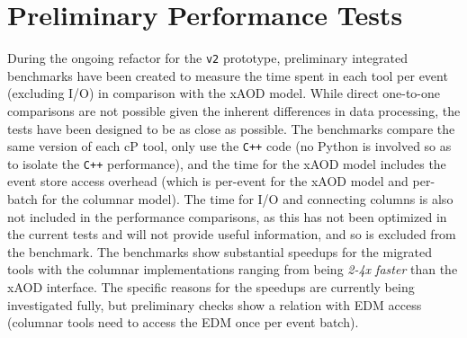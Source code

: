 \section{Preliminary Performance Tests}\label{sec:performance}

During the ongoing refactor for the \texttt{v2} prototype, preliminary integrated benchmarks have been created to measure the time spent in each tool per event (excluding I/O) in comparison with the xAOD model.
While direct one-to-one comparisons are not possible given the inherent differences in data processing, the tests have been designed to be as close as possible.
The benchmarks compare the same version of each cP tool, only use the \texttt{C++} code (no Python is involved so as to isolate the \texttt{C++} performance), and the time for the xAOD model includes the event store access overhead (which is per-event for the xAOD model and per-batch for the columnar model).
The time for I/O and connecting columns is also not included in the performance comparisons, as this has not been optimized in the current tests and will not provide useful information, and so is excluded from the benchmark.
The benchmarks show substantial speedups for the migrated tools with the columnar implementations ranging from being \emph{2-4x faster} than the xAOD interface.
The specific reasons for the speedups are currently being investigated fully, but preliminary checks show a relation with EDM access (columnar tools need to access the EDM once per event batch).
